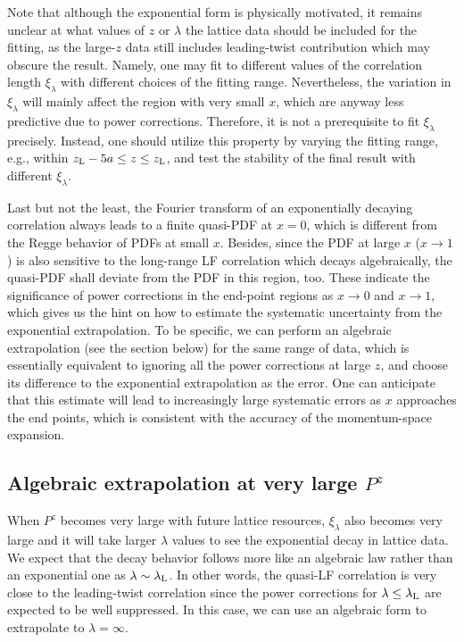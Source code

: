 \documentclass[preprint,12pt]{elsarticle}
\begin{document}
Note that although the exponential form is physically motivated, it remains unclear at what values of $z$ or $\lambda$ the lattice data should be included for the fitting, as the large-$z$ data still includes leading-twist contribution which may obscure the result. Namely, one may fit to different values of the correlation length $\xi_\lambda$ with different choices of the fitting range. Nevertheless, the variation in $\xi_\lambda$ will mainly affect the region with very small $x$, which are anyway less predictive due to power corrections. Therefore, it is not a prerequisite to fit $\xi_\lambda$ precisely. Instead, one should utilize this property by varying the fitting range, e.g., within $z_{\rm L}-5a\le z \le z_{\rm L}$, and test the stability of the final result with different $\xi_{\lambda}$.

Last but not the least, the Fourier transform of an exponentially decaying correlation always leads to a finite quasi-PDF at $x=0$, which is different from the Regge behavior of PDFs at small $x$. Besides, since the PDF at large $x$ ($x\to1$) is also sensitive to the long-range LF correlation which decays algebraically, the quasi-PDF shall deviate from the PDF in this region, too. These indicate the significance of power corrections in the end-point regions as $x\to0$ and $x\to1$, which gives us the hint on how to estimate the systematic uncertainty from the exponential extrapolation. To be specific, we can perform an algebraic extrapolation (see the section below) for the same range of data, which is essentially equivalent to ignoring all the power corrections at large $z$, and choose its difference to the exponential extrapolation as the error. One can anticipate that this estimate will lead to increasingly large systematic errors as $x$ approaches the end points, which is consistent with the accuracy of the momentum-space expansion.

\subsection{Algebraic extrapolation at very large $P^z$}

When $P^z$ becomes very large with future lattice resources,
 $\xi_\lambda$ also becomes very large and it will take larger $\lambda$ values to see the exponential decay in lattice data. We expect that the decay behavior follows more like an algebraic law rather than an exponential one as $\lambda\sim\lambda_{\rm L}$. In other words, the quasi-LF correlation is very close to the leading-twist correlation since the power corrections for $\lambda \le \lambda_{\rm L}$ are expected to be well suppressed. In this case, we can use an algebraic form to extrapolate to $\lambda=\infty$.
\end{document}
